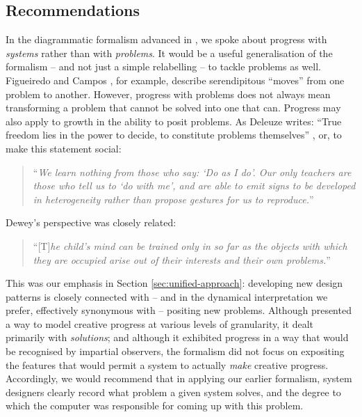 \subsection{Recommendations} \label{sec:recommendations}

In the diagrammatic formalism advanced in
\cite{colton-assessingprogress}, we spoke about progress with
\emph{systems} rather than with \emph{problems}.  It would be a useful
generalisation of the formalism -- and not just a simple relabelling
-- to tackle problems as well.
%
Figueiredo and Campos \citeyear{Figueiredo2001}, for example, describe
serendipitous ``moves'' from one problem to another.
%
However, progress with problems does not always mean transforming a
problem that cannot be solved into one that can.  Progress may also
apply to growth in the ability to posit problems.  As Deleuze writes:
``True freedom lies in the power to decide, to constitute problems
themselves'' \cite[p. 15]{deleuze1991bergsonism}, or, to make this
statement social:
\begin{quote}
``\emph{We learn nothing from those who say: `Do as I do'. Our only teachers
  are those who tell us to `do with me', and are able to emit signs to
  be developed in heterogeneity rather than propose gestures for us to
  reproduce.}''~\cite[p. 26]{deleuze1994difference}
\end{quote}

Dewey's perspective
was closely related:
\begin{quote}
``[T]\emph{he child's mind can be trained only in so far as the
    objects with which they are occupied arise out of their interests
    and their own problems.}''~\cite{dewey-by-mead}
\end{quote}

This was our emphasis in Section \ref{sec:unified-approach}:
developing new design patterns is closely connected with -- and in the
dynamical interpretation we prefer, effectively synonymous with --
positing new problems.  Although \cite{colton-assessingprogress}
presented a way to model creative progress at various levels of
granularity, it dealt primarily with \emph{solutions}; and although it
exhibited progress in a way that would be recognised by impartial
observers, the formalism did not focus on expositing the features that
would permit a system to actually \emph{make} creative progress.
Accordingly, we would recommend that in applying our earlier
formalism, system designers clearly record what problem a given system
solves, and the degree to which the computer was responsible for
coming up with this problem.

